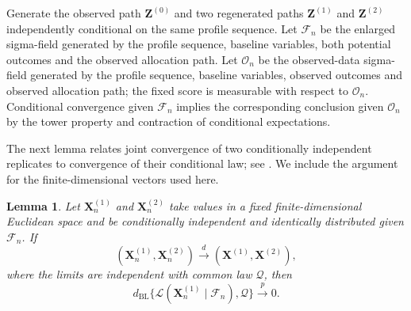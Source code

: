 \documentclass[12pt,a4paper]{article}
\newtheorem{lemma}{Lemma}
\theoremstyle{definition}
\theoremstyle{remark}\newtheorem{remark}{Remark}
\numberwithin{equation}{section}
\begin{document}
Generate the observed path $\bm Z^{(0)}$ and two regenerated paths $\bm Z^{(1)}$ and $\bm Z^{(2)}$ independently conditional on the same profile sequence. Let $\mathcal F_n$ be the enlarged sigma-field generated by the profile sequence, baseline variables, both potential outcomes and the observed allocation path. Let $\mathcal O_n$ be the observed-data sigma-field generated by the profile sequence, baseline variables, observed outcomes and observed allocation path; the fixed score is measurable with respect to $\mathcal O_n$. Conditional convergence given $\mathcal F_n$ implies the corresponding conclusion given $\mathcal O_n$ by the tower property and contraction of conditional expectations.

The next lemma relates joint convergence of two conditionally independent replicates to convergence of their conditional law; see \citet{BuecherKojadinovic2019}. We include the argument for the finite-dimensional vectors used here.

\begin{lemma}\label{lem:supp-conditional-convergence}
Let $\bm X_n^{(1)}$ and $\bm X_n^{(2)}$ take values in a fixed finite-dimensional Euclidean space and be conditionally independent and identically distributed given $\mathcal F_n$. If
\[
(\bm X_n^{(1)},\bm X_n^{(2)})
\xrightarrow{d}
(\bm X^{(1)},\bm X^{(2)}),
\]
where the limits are independent with common law $\mathcal Q$, then
\[
d_{\mathrm{BL}}\{\mathcal L(\bm X_n^{(1)}\mid\mathcal F_n),\mathcal Q\}
\xrightarrow{p}0.
\]
\end{lemma}
\end{document}
